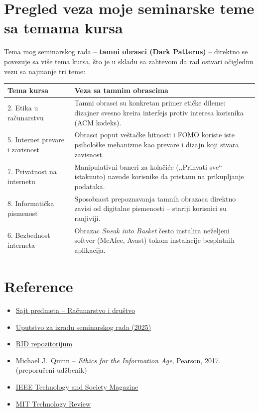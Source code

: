 \documentclass[12pt,a4paper]{article}
\begin{document}
\section{Pregled veza moje seminarske teme sa temama kursa}

Tema mog seminarskog rada -- \textbf{tamni obrasci (Dark Patterns)} -- direktno se
povezuje sa više tema kursa, što je u skladu sa zahtevom da rad ostvari očiglednu vezu
sa najmanje tri teme:

\begin{table}[h!]
\centering
\begin{tabular}{p{} p{}}
\toprule
\textbf{Tema kursa} & \textbf{Veza sa tamnim obrascima} \\
\midrule
2. Etika u računarstvu &
    Tamni obrasci su konkretan primer etičke dileme: dizajner svesno kreira interfejs
    protiv interesa korisnika (ACM kodeks). \\[6pt]
5. Internet prevare i zavisnost &
    Obrasci poput veštačke hitnosti i FOMO koriste iste psihološke mehanizme kao
    prevare i dizajn koji stvara zavisnost. \\[6pt]
7. Privatnost na internetu &
    Manipulativni baneri za kolačiće (,,Prihvati sve`` istaknuto) navode korisnike da
    pristanu na prikupljanje podataka. \\[6pt]
8. Informatička pismenost &
    Sposobnost prepoznavanja tamnih obrazaca direktno zavisi od digitalne pismenosti
    -- stariji korisnici su ranjiviji. \\[6pt]
6. Bezbednost interneta &
    Obrazac \emph{Sneak into Basket} često instalira neželjeni softver (McAfee, Avast)
    tokom instalacije besplatnih aplikacija. \\
\bottomrule
\end{tabular}
\end{table}

\section*{Reference}

\begin{itemize}
    \item \href{https://poincare.matf.bg.ac.rs/~sana.stojanovic.djurdjevic/rid.htm}%
          {Sajt predmeta -- Računarstvo i društvo}
    \item \href{https://github.com/sanastojanovic/RID/blob/main/rid_2025_seminarski/uputstvo_2025.txt}%
          {Uputstvo za izradu seminarskog rada (2025)}
    \item \href{https://github.com/sanastojanovic/RID}{RID repozitorijum}
    \item Michael J.\ Quinn -- \emph{Ethics for the Information Age}, Pearson, 2017.
          (preporučeni udžbenik)
    \item \href{https://technologyandsociety.org/technology-and-society-magazine/}%
          {IEEE Technology and Society Magazine}
    \item \href{https://www.technologyreview.com/}{MIT Technology Review}
\end{itemize}
\end{document}
